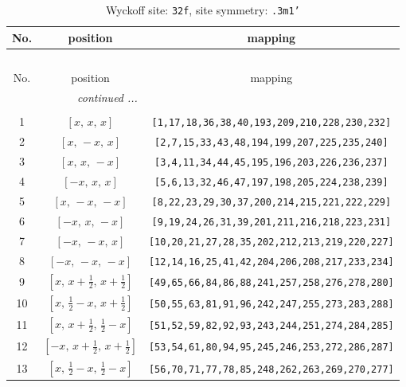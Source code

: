\documentclass[fleqn,8pt]{jsarticle}
\begin{document}
\begin{longtable}{ccc}
\caption{Wyckoff site: {\tt 32f}, site symmetry: {\tt .3m1'}}
 \\
 \hline \hline
No. & position & mapping \\ \hline \endfirsthead

\multicolumn{2}{l}{\tablename\ \thetable{}} \\
 \hline \hline
No. & position & mapping \\ \hline \endhead

 \hline \hline
\multicolumn{2}{r}{\footnotesize\it continued ...} \\ \endfoot

 \hline \hline
\multicolumn{2}{r}{} \\ \endlastfoot

1 & $\left[ x,\, x,\, x \right]$ & {\tt [1,17,18,36,38,40,193,209,210,228,230,232]} \\ \hline
2 & $\left[ x,\, - x,\, x \right]$ & {\tt [2,7,15,33,43,48,194,199,207,225,235,240]} \\ \hline
3 & $\left[ x,\, x,\, - x \right]$ & {\tt [3,4,11,34,44,45,195,196,203,226,236,237]} \\ \hline
4 & $\left[ - x,\, x,\, x \right]$ & {\tt [5,6,13,32,46,47,197,198,205,224,238,239]} \\ \hline
5 & $\left[ x,\, - x,\, - x \right]$ & {\tt [8,22,23,29,30,37,200,214,215,221,222,229]} \\ \hline
6 & $\left[ - x,\, x,\, - x \right]$ & {\tt [9,19,24,26,31,39,201,211,216,218,223,231]} \\ \hline
7 & $\left[ - x,\, - x,\, x \right]$ & {\tt [10,20,21,27,28,35,202,212,213,219,220,227]} \\ \hline
8 & $\left[ - x,\, - x,\, - x \right]$ & {\tt [12,14,16,25,41,42,204,206,208,217,233,234]} \\ \hline
9 & $\left[ x,\, x + \frac{1}{2},\, x + \frac{1}{2} \right]$ & {\tt [49,65,66,84,86,88,241,257,258,276,278,280]} \\ \hline
10 & $\left[ x,\, \frac{1}{2} - x,\, x + \frac{1}{2} \right]$ & {\tt [50,55,63,81,91,96,242,247,255,273,283,288]} \\ \hline
11 & $\left[ x,\, x + \frac{1}{2},\, \frac{1}{2} - x \right]$ & {\tt [51,52,59,82,92,93,243,244,251,274,284,285]} \\ \hline
12 & $\left[ - x,\, x + \frac{1}{2},\, x + \frac{1}{2} \right]$ & {\tt [53,54,61,80,94,95,245,246,253,272,286,287]} \\ \hline
13 & $\left[ x,\, \frac{1}{2} - x,\, \frac{1}{2} - x \right]$ & {\tt [56,70,71,77,78,85,248,262,263,269,270,277]} \\ \hline

\end{longtable}
\end{document}

